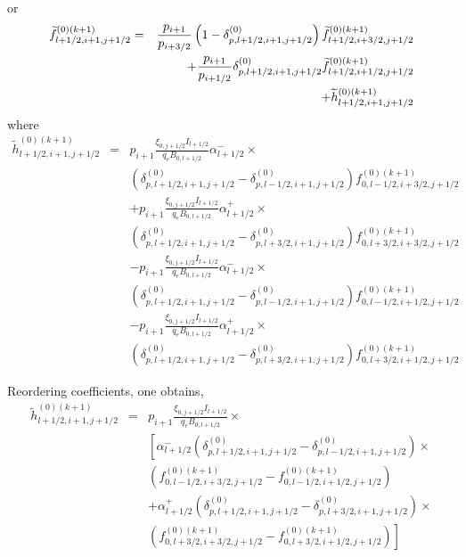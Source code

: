 or
\begin{eqnarray}
\widetilde{f}_{l+1/2,i+1,j+1/2}^{\left( 0\right) (k+1)} &=&\frac{p_{i+1}}{%
p_{i+3/2}}\left( 1-\delta _{p,l+1/2,i+1,j+1/2}^{(0)}\right) \widetilde{f}%
_{l+1/2,i+3/2,j+1/2}^{(0)(k+1)}  \nonumber \\
&&+\frac{p_{i+1}}{p_{i+1/2}}\delta _{p,l+1/2,i+1,j+1/2}^{(0)}\widetilde{f}%
_{l+1/2,i+1/2,j+1/2}^{(0)(k+1)}  \nonumber \\
&&+\widetilde{h}_{l+1/2,i+1,j+1/2}^{\left( 0\right) (k+1)}
\end{eqnarray}
where
\begin{eqnarray}
\widetilde{h}_{l+1/2,i+1,j+1/2}^{\left( 0\right) (k+1)} &=&p_{i+1}\frac{\xi
_{0,j+1/2}I_{l+1/2}}{q_{e}B_{0,l+1/2}}\alpha _{l+1/2}^{-}\times   \nonumber
\\
&&\left( \delta _{p,l+1/2,i+1,j+1/2}^{(0)}-\delta
_{p,l-1/2,i+1,j+1/2}^{(0)}\right) f_{0,l-1/2,i+3/2,j+1/2}^{(0)(k+1)}
\nonumber \\
&&+p_{i+1}\frac{\xi _{0,j+1/2}I_{l+1/2}}{q_{e}B_{0,l+1/2}}\alpha _{l+1/2}^{+}%
\times   \nonumber \\
&&\left( \delta _{p,l+1/2,i+1,j+1/2}^{(0)}-\delta
_{p,l+3/2,i+1,j+1/2}^{(0)}\right) f_{0,l+3/2,i+3/2,j+1/2}^{(0)(k+1)}
\nonumber \\
&&-p_{i+1}\frac{\xi _{0,j+1/2}I_{l+1/2}}{q_{e}B_{0,l+1/2}}\alpha _{l+1/2}^{-}%
\times   \nonumber \\
&&\left( \delta _{p,l+1/2,i+1,j+1/2}^{(0)}-\delta
_{p,l-1/2,i+1,j+1/2}^{(0)}\right) f_{0,l-1/2,i+1/2,j+1/2}^{(0)(k+1)}
\nonumber \\
&&-p_{i+1}\frac{\xi _{0,j+1/2}I_{l+1/2}}{q_{e}B_{0,l+1/2}}\alpha _{l+1/2}^{+}%
\times   \nonumber \\
&&\left( \delta _{p,l+1/2,i+1,j+1/2}^{(0)}-\delta
_{p,l+3/2,i+1,j+1/2}^{(0)}\right) f_{0,l+3/2,i+1/2,j+1/2}^{(0)(k+1)}
\end{eqnarray}

Reordering coefficients, one obtains,
\begin{eqnarray}
\widetilde{h}_{l+1/2,i+1,j+1/2}^{\left( 0\right) (k+1)} &=&p_{i+1}\frac{\xi
_{0,j+1/2}I_{l+1/2}}{q_{e}B_{0,l+1/2}}\times   \nonumber \\
&&\left[ \alpha _{l+1/2}^{-}\left( \delta _{p,l+1/2,i+1,j+1/2}^{(0)}-\delta
_{p,l-1/2,i+1,j+1/2}^{(0)}\right) \times \right.   \nonumber \\
&&\left(
f_{0,l-1/2,i+3/2,j+1/2}^{(0)(k+1)}-f_{0,l-1/2,i+1/2,j+1/2}^{(0)(k+1)}\right)
\nonumber \\
&&+\alpha _{l+1/2}^{+}\left( \delta _{p,l+1/2,i+1,j+1/2}^{(0)}-\delta
_{p,l+3/2,i+1,j+1/2}^{(0)}\right) \times   \nonumber \\
&&\left. \left(
f_{0,l+3/2,i+3/2,j+1/2}^{(0)(k+1)}-f_{0,l+3/2,i+1/2,j+1/2}^{(0)(k+1)}\right)
\right]   \label{dkegridinterp1}
\end{eqnarray}

